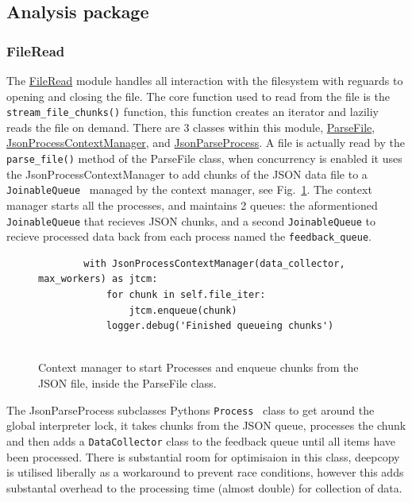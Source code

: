 \documentclass[11pt]{article}
\newcommand{\code}[1]{\colorbox{light-gray}{\texttt{#1}}}
\begin{document}
\subsection{Analysis package}
\subsubsection{FileRead}\label{sec:FileRead}
The \href{https://www2.macs.hw.ac.uk/~sf52/DocuTrace/html/DocuTrace.Analysis.html#module-DocuTrace.Analysis.FileRead}{FileRead} module handles all interaction with the filesystem with reguards to opening and closing the file. The core function used to read from the file is the \code{stream\_file\_chunks()} function, this function creates an iterator and laziliy reads the file on demand. 
There are 3 classes within this module, \href{https://www2.macs.hw.ac.uk/~sf52/DocuTrace/html/DocuTrace.Analysis.html#DocuTrace.Analysis.FileRead.ParseFile}{ParseFile}, \href{https://www2.macs.hw.ac.uk/~sf52/DocuTrace/html/DocuTrace.Analysis.html#DocuTrace.Analysis.FileRead.JsonProcessContextManager}{JsonProcessContextManager}, and \href{https://www2.macs.hw.ac.uk/~sf52/DocuTrace/html/DocuTrace.Analysis.html#DocuTrace.Analysis.FileRead.ParseFile}{JsonParseProcess}. 
A file is actually read by the \code{parse\_file()} method of the ParseFile class, when concurrency is enabled it uses the JsonProcessContextManager to add chunks of the JSON data file to a \code{JoinableQueue}~\autocite{MultiprocessingProcessbasedParallelism} managed by the context manager, see Fig.~\ref{fig:JSONPContextManager}.
The context manager starts all the processes, and maintains 2 queues: the aformentioned \code{JoinableQueue} that recieves JSON chunks, and a second \code{JoinableQueue} to recieve processed data back from each process named the \code{feedback\_queue}.

\begin{figure}[h]
    \begin{verbatim}
        with JsonProcessContextManager(data_collector, max_workers) as jtcm:
            for chunk in self.file_iter:
                jtcm.enqueue(chunk)
            logger.debug('Finished queueing chunks')
        
    \end{verbatim}
    \caption{Context manager to start Processes and enqueue chunks from the JSON file, inside the ParseFile class.}
    \label{fig:JSONPContextManager}
\end{figure}

The JsonParseProcess subclasses Pythons \code{Process}~\autocite{MultiprocessingProcessbasedParallelism} class to get around the global interpreter lock, it takes chunks from the JSON queue, processes the chunk and then adds a \code{DataCollector} class to the feedback queue until all items have been processed. 
There is substantial room for optimisaion in this class, deepcopy is utilised liberally as a workaround to prevent race conditions, however this adds substantal overhead to the processing time (almost double) for collection of data.
\end{document}
